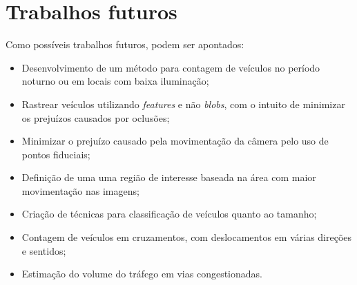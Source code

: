 
\section{Trabalhos futuros} %

Como possíveis trabalhos futuros, podem ser apontados:

\begin{itemize}
  \item Desenvolvimento de um método para contagem de veículos no período noturno ou em locais com baixa iluminação;
  \item Rastrear veículos utilizando \textit{features} e não \textit{blobs}, com o intuito de minimizar os prejuízos causados por oclusões;
  \item Minimizar o prejuízo causado pela movimentação da câmera pelo uso de pontos fiduciais;
  \item Definição de uma uma região de interesse baseada na área com maior movimentação nas imagens;
  \item Criação de técnicas para classificação de veículos quanto ao tamanho;
  \item Contagem de veículos em cruzamentos, com deslocamentos em várias direções e sentidos;
  \item Estimação do volume do tráfego em vias congestionadas.
\end{itemize}

\label{sec:trabalhos_futuros}

